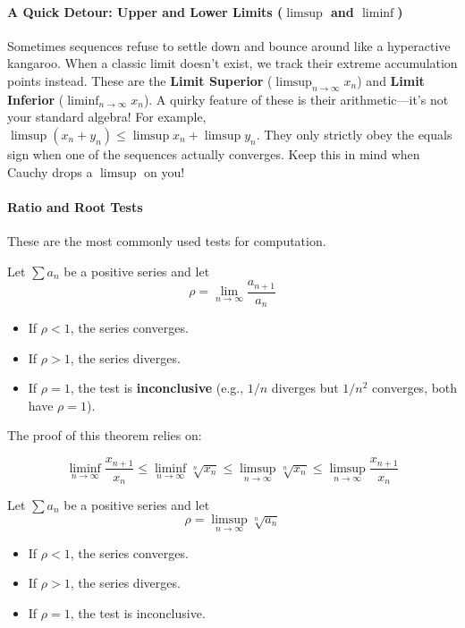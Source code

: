 \paragraph{A Quick Detour: Upper and Lower Limits ($\limsup$ and $\liminf$)}
Sometimes sequences refuse to settle down and bounce around like a hyperactive kangaroo. When a classic limit doesn't exist, we track their extreme accumulation points instead. These are the \textbf{Limit Superior} ($\limsup_{n \to \infty} x_n$) and \textbf{Limit Inferior} ($\liminf_{n \to \infty} x_n$). 
A quirky feature of these is their arithmetic—it's not your standard algebra! For example, $\limsup (x_n + y_n) \le \limsup x_n + \limsup y_n$. They only strictly obey the equals sign when one of the sequences actually converges. Keep this in mind when Cauchy drops a $\limsup$ on you!

\paragraph{Ratio and Root Tests}
These are the most commonly used tests for computation.

\begin{theorem}
Let $\sum a_n$ be a positive series and let
\[ \rho = \lim_{n \to \infty} \frac{a_{n+1}}{a_n} \]
\begin{itemize}
    \item If $\rho < 1$, the series converges.
    \item If $\rho > 1$, the series diverges.
    \item If $\rho = 1$, the test is \textbf{inconclusive} (e.g., $1/n$ diverges but $1/n^2$ converges, both have $\rho=1$).
\end{itemize}
\end{theorem}

The proof of this theorem relies on:

\[
\liminf_{n \to \infty} \frac{x_{n+1}}{x_n} \leq \liminf_{n \to \infty} \sqrt[n]{x_n} \leq \limsup_{n \to \infty} \sqrt[n]{x_n} \leq \limsup_{n \to \infty} \frac{x_{n+1}}{x_n}
\]

\newpage

\begin{theorem}
Let $\sum a_n$ be a positive series and let
\[ \rho = \limsup_{n \to \infty} \sqrt[n]{a_n} \]
\begin{itemize}
    \item If $\rho < 1$, the series converges.
    \item If $\rho > 1$, the series diverges.
    \item If $\rho = 1$, the test is inconclusive.
\end{itemize}
\end{theorem}


